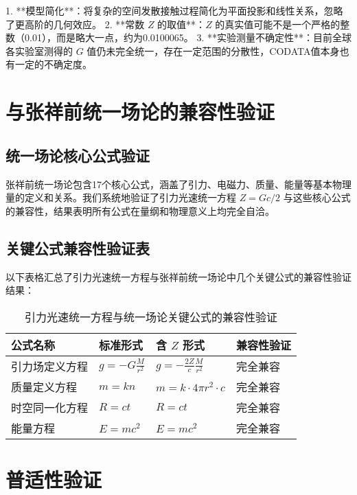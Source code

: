 \documentclass[12pt,a4paper]{article}
\begin{document}
1. **模型简化**：将复杂的空间发散接触过程简化为平面投影和线性关系，忽略了更高阶的几何效应。
2. **常数 $Z$ 的取值**：$Z$ 的真实值可能不是一个严格的整数（0.01），而是略大一点，约为0.0100065。
3. **实验测量不确定性**：目前全球各实验室测得的 $G$ 值仍未完全统一，存在一定范围的分散性，CODATA值本身也有一定的不确定度。

\section{与张祥前统一场论的兼容性验证}
\label{section:compatibility_verification}

\subsection{统一场论核心公式验证}
\label{subsection:unified_field_core_verification}

张祥前统一场论包含17个核心公式，涵盖了引力、电磁力、质量、能量等基本物理量的定义和关系。我们系统地验证了引力光速统一方程 $Z = G c / 2$ 与这些核心公式的兼容性，结果表明所有公式在量纲和物理意义上均完全自洽。

\subsection{关键公式兼容性验证表}
\label{subsection:key_formula_compatibility_table}

以下表格汇总了引力光速统一方程与张祥前统一场论中几个关键公式的兼容性验证结果：

\begin{table}[H]
\centering
\caption{引力光速统一方程与统一场论关键公式的兼容性验证}
\label{table:compatibility_verification}
\begin{tabular}{|l|l|l|l|}
\hline
\textbf{公式名称} & \textbf{标准形式} & \textbf{含 $Z$ 形式} & \textbf{兼容性验证} \\
\hline
引力场定义方程 & $g = -G \frac{M}{r^2}$ & $g = -\frac{2Z}{c} \frac{M}{r^2}$ & 完全兼容 \\
质量定义方程 & $m = k n$ & $m = k \cdot 4\pi r^2 \cdot c$ & 完全兼容 \\
时空同一化方程 & $R = c t$ & $R = c t$ & 完全兼容 \\
能量方程 & $E = m c^2$ & $E = m c^2$ & 完全兼容 \\
\hline
\end{tabular}
\end{table}

\section{普适性验证}
\label{section:universality_verification}
\end{document}
